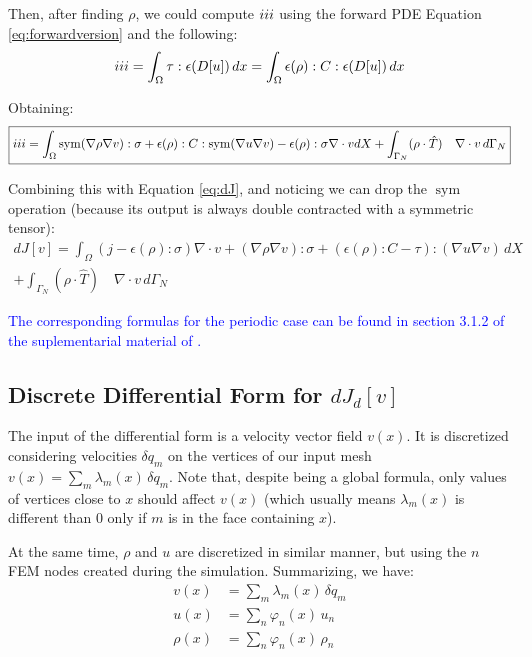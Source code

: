 \documentclass[11pt]{article}
\DeclareMathOperator{\sym}{sym}
\newcommand{\RNum}[1]{\uppercase\expandafter{\romannumeral #1\relax}}
\newcommand{\blue}{\textcolor{blue}}
\begin{document}
Then, after finding $\rho$, we could compute $\RNum{3}$ using the forward PDE Equation \ref{eq:forwardversion} and the following:
\begin{align*}
  \RNum{3} = \int_\Omega \tau:\epsilon(D[u])\, dx = \int_\Omega \epsilon(\rho):C:\epsilon(D[u]) \, dx
\end{align*}

Obtaining:
\begin{equation}
  \boxed{\RNum{3} =
  \int_{\Omega} \sym(\nabla \rho \nabla v):\sigma + \epsilon(\rho):C:\sym(\nabla u \nabla v) - \epsilon(\rho): \sigma \nabla \cdot v  dX + \int_{\Gamma_{N}} (\rho \cdot \hat T) \quad \nabla \cdot v\, d\Gamma_{N}}
  \label{eq:IIIcomputation}
\end{equation}

Combining this with Equation \ref{eq:dJ}, and noticing we can drop the $\sym$ operation (because its output is always double contracted with a symmetric tensor):
\begin{multline}
  \boxed{dJ[v] = \int_{\Omega} (j - \epsilon(\rho): \sigma)\nabla \cdot v + (\nabla \rho \nabla v):\sigma + (\epsilon(\rho):C - \tau) : (\nabla u \nabla v) \, dX } \\ \boxed{+ \int_{\Gamma_{N}} (\rho \cdot \hat T) \quad \nabla \cdot v\, d\Gamma_{N}  }
  \label{eq:completedJ}
\end{multline}

\blue{The corresponding formulas for the periodic case can be found in section 3.1.2 of the suplementarial material of \cite{panetta2017}.}

\subsection{Discrete Differential Form for $dJ_d[v]$}

The input of the differential form is a velocity vector field $v(x)$. It is discretized considering velocities $\delta q_m$ on the vertices of our input mesh $v(x) = \sum_m \lambda_m(x) \, \delta q_m$. Note that, despite being a global formula, only values of vertices close to $x$ should affect $v(x)$ (which usually means $\lambda_m(x)$ is different than $0$ only if $m$ is in the face containing $x$).

At the same time, $\rho$ and $u$ are discretized in similar manner, but using the $n$ FEM nodes created during the simulation. Summarizing, we have:
\begin{align*}
    v(x) &= \sum_m \lambda_m(x) \, \delta q_m\\
    u(x) &= \sum_n \varphi_n(x) \, u_n\\
    \rho(x) &= \sum_n \varphi_n(x) \, \rho_n
\end{align*}
\end{document}
